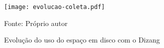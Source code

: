 
\begin{figure}[htb!]
\footnotesize
\caption{Evolução do uso do espaço em disco com o Dizang}
\texttt{[image: evolucao-coleta.pdf]}
\centering
\label{fig:evolucao-coleta}
\begin{center}
Fonte: Próprio autor 
\end{center}
\end{figure}


\begin{comment}
A Figura \ref{fig:memoria_salva}, por sua vez, mostra uma listagem de alguns dos instantâneos de memória salvos pela solução depois que os contêineres são removidos. 
%
Nela pode-se ver que as coletas continuaram no disco da máquina mesmo após a remoção dos contêineres. 
%
Usando o identificador do contêiner e da imagem, consegue-se associar a evidência a sua origem (i.e., a imagem e o contêiner), conforme esperado para uma análise forense.
%
Essa capacidade se mantém após a detecção de uma ameaça, pois nesse caso coletas mais antigas deixam de ser apagadas.
%
Assim, é possível descrever o estado do sistema antes e depois do incidente \cite{Case_Memory_Forensics:2014}, permitindo-se, por exemplo, que ataques de injeção de código em memória sejam analisados.


\begin{figure*}[htb!]
\footnotesize
\caption{Exemplo de lista de instantâneos de memória.}
\fbox{
\texttt{[image: memoria\_salva.jpg]}
}
\centering
\label{fig:memoria_salva}
\end{figure*}

\end{comment}

